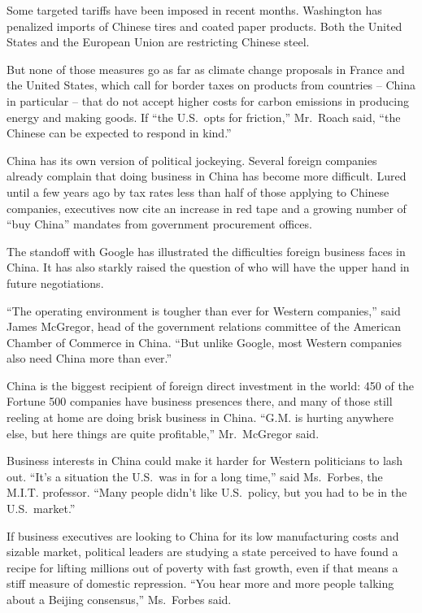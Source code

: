 ﻿\documentclass[12pt]{article}
\begin{document}
Some targeted tariffs have been imposed in recent months. Washington has penalized imports of
Chinese tires and coated paper products. Both the United States and the European Union are
restricting Chinese steel.

But none of those measures go as far as climate change proposals in France and the United States,
which call for border taxes on products from countries -- China in particular -- that do not accept
higher costs for carbon emissions in producing energy and making goods. If ``the U.S.~opts for
friction,'' Mr.~Roach said, ``the Chinese can be expected to respond in kind.''

China has its own version of political jockeying. Several foreign companies already complain that
doing business in China has become more difficult. Lured until a few years ago by tax rates less
than half of those applying to Chinese companies, executives now cite an increase in red tape and a
growing number of ``buy China'' mandates from government procurement offices.

The standoff with Google has illustrated the difficulties foreign business faces in China. It has
also starkly raised the question of who will have the upper hand in future negotiations.

``The operating environment is tougher than ever for Western companies,'' said James McGregor, head
of the government relations committee of the American Chamber of Commerce in China. ``But unlike
Google, most Western companies also need China more than ever.''

China is the biggest recipient of foreign direct investment in the world: 450 of the Fortune 500
companies have business presences there, and many of those still reeling at home are doing brisk
business in China. ``G.M. is hurting anywhere else, but here things are quite profitable,''
Mr.~McGregor said.

Business interests in China could make it harder for Western politicians to lash out. ``It's a
situation the U.S.~was in for a long time,'' said Ms.~Forbes, the M.I.T. professor. ``Many people
didn't like U.S.~policy, but you had to be in the U.S.~market.''

If business executives are looking to China for its low manufacturing costs and sizable market,
political leaders are studying a state perceived to have found a recipe for lifting millions out of
poverty with fast growth, even if that means a stiff measure of domestic repression. ``You hear more
and more people talking about a Beijing consensus,'' Ms.~Forbes said.
\end{document}
